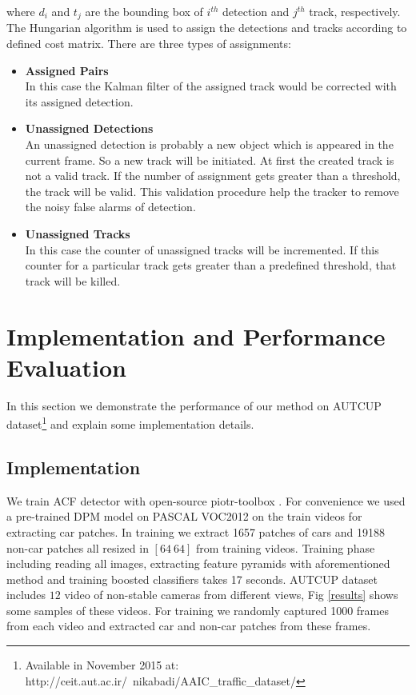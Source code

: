 \documentclass[conference]{IEEEtran}
\begin{document}
where $d_i$ and $t_j$ are the bounding box of $i^{th}$ detection and $j^{th}$ track, respectively. The Hungarian algorithm \cite{} is used to assign the detections and tracks according to defined cost matrix. There are three types of assignments:
\begin{itemize}
\item \textbf{Assigned Pairs}\\
In this case the Kalman filter of the assigned track would be corrected with its assigned detection.

\item \textbf{Unassigned Detections}\\
An unassigned detection is probably a new object which is appeared in the current frame. So a new track will be initiated. At first the created track is not a valid track. If the number of assignment gets greater than a threshold, the track will be valid. This validation procedure help the tracker to remove the noisy false alarms of detection.

\item \textbf{Unassigned Tracks}\\	
In this case the counter of unassigned tracks will be incremented. If this counter for a particular track gets greater than a predefined threshold, that track will be killed. 
	
\end{itemize}






\section{Implementation and Performance Evaluation}
In this section we demonstrate the performance of our method on AUTCUP dataset\footnote{Available in November 2015 at: http://ceit.aut.ac.ir/~nikabadi/AAIC\_traffic\_dataset/} and explain some implementation details.\\
\subsection{Implementation}
We train ACF detector with open-source piotr-toolbox \cite{PMT}.  For convenience we used a pre-trained DPM model on PASCAL VOC2012 on the train videos for extracting car patches. In training we extract 1657 patches of cars and 19188 non-car patches all resized in $[64\ 64]$ from training videos. Training phase including reading all images, extracting feature pyramids with aforementioned method and training boosted classifiers takes 17 seconds.
AUTCUP dataset includes $12$ video of non-stable cameras from different views, Fig \ref{results} shows some samples of these videos. For training we randomly captured 1000  frames from each video and extracted car and non-car patches from these frames.
\end{document}
